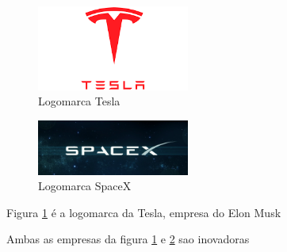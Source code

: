 \documentclass[a4paper, 12pt]{article}
\begin{document}
\maketitle

\begin{figure}[ht]
    \centering
    \includegraphics[width=5cm]{ tesla.png} %
    \caption{Logomarca Tesla}
    \label{Fig01} %
\end{figure}

\begin{figure}[ht]
    \centering
    \includegraphics[width=5cm]{ SpaceX-Logo.png} %
    \caption{Logomarca SpaceX}
    \label{Fig02} %
\end{figure}

Figura \ref{Fig01} é a logomarca da Tesla, empresa do Elon Musk

Ambas as empresas da figura \ref{Fig01} e \ref{Fig02} sao inovadoras
\end{document}

